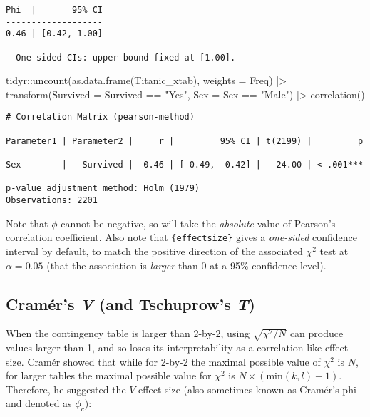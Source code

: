 \documentclass[mathematics,article,submit,moreauthors,pdftex]{mdpi}
\newenvironment{Shaded}{\begin{snugshade}}{\end{snugshade}}
\newcommand{\AttributeTok}[1]{\textcolor[rgb]{0.77,0.63,0.00}{#1}}
\newcommand{\FunctionTok}[1]{\textcolor[rgb]{0.00,0.00,0.00}{#1}}
\newcommand{\NormalTok}[1]{#1}
\newcommand{\SpecialCharTok}[1]{\textcolor[rgb]{0.00,0.00,0.00}{#1}}
\newcommand{\StringTok}[1]{\textcolor[rgb]{0.31,0.60,0.02}{#1}}
\begin{document}
\begin{verbatim}
Phi  |       95% CI
-------------------
0.46 | [0.42, 1.00]

- One-sided CIs: upper bound fixed at [1.00].
\end{verbatim}

\begin{Shaded}
\begin{Highlighting}[]
\NormalTok{tidyr}\SpecialCharTok{::}\FunctionTok{uncount}\NormalTok{(}\FunctionTok{as.data.frame}\NormalTok{(Titanic\_xtab), }\AttributeTok{weights =}\NormalTok{ Freq) }\SpecialCharTok{|\textgreater{}}
  \FunctionTok{transform}\NormalTok{(}\AttributeTok{Survived =}\NormalTok{ Survived }\SpecialCharTok{==} \StringTok{"Yes"}\NormalTok{, }\AttributeTok{Sex =}\NormalTok{ Sex }\SpecialCharTok{==} \StringTok{"Male"}\NormalTok{) }\SpecialCharTok{|\textgreater{}}
  \FunctionTok{correlation}\NormalTok{()}
\end{Highlighting}
\end{Shaded}

\begin{verbatim}
# Correlation Matrix (pearson-method)

Parameter1 | Parameter2 |     r |         95% CI | t(2199) |         p
----------------------------------------------------------------------
Sex        |   Survived | -0.46 | [-0.49, -0.42] |  -24.00 | < .001***

p-value adjustment method: Holm (1979)
Observations: 2201
\end{verbatim}

Note that \(\phi\) cannot be negative, so will take the \emph{absolute}
value of Pearson's correlation coefficient. Also note that
\texttt{\{effectsize\}} gives a \emph{one-sided} confidence interval by
default, to match the positive direction of the associated \(\chi^2\)
test at \(\alpha = 0.05\) (that the association is \emph{larger} than 0
at a 95\% confidence level).

\hypertarget{cramuxe9rs-v-and-tschuprows-t}{%
\subsection{\texorpdfstring{Cramér's \emph{V} (and Tschuprow's
\emph{T})}{Cramér's V (and Tschuprow's T)}}\label{cramuxe9rs-v-and-tschuprows-t}}

When the contingency table is larger than 2-by-2, using
\(\sqrt{\chi^2/N}\) can produce values larger than 1, and so loses its
interpretability as a correlation like effect size. Cramér showed
\citep{cramer1999mathematical} that while for 2-by-2 the maximal
possible value of \(\chi^2\) is \(N\), for larger tables the maximal
possible value for \(\chi^2\) is \(N\times (\text{min}(k,l)-1)\).
Therefore, he suggested the \(V\) effect size (also sometimes known as
Cramér's phi and denoted as \(\phi_{c}\)):
\end{document}
